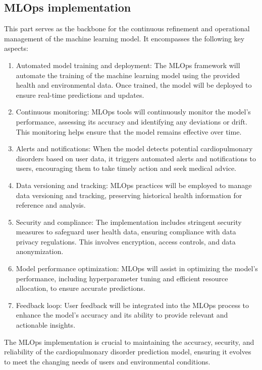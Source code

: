 \documentclass[12pt]{article}
\begin{document}
\subsection{MLOps implementation}
This part serves as the backbone for the continuous refinement and operational management of the machine learning model. It encompasses the following key aspects:
\begin{enumerate}
    \item Automated model training and deployment: The MLOps framework will automate the training of the machine learning model using the provided health and environmental data. Once trained, the model will be deployed to ensure real-time predictions and updates.

    \item Continuous monitoring: MLOps tools will continuously monitor the model's performance, assessing its accuracy and identifying any deviations or drift. This monitoring helps ensure that the model remains effective over time.

    \item Alerts and notifications: When the model detects potential cardiopulmonary disorders based on user data, it triggers automated alerts and notifications to users, encouraging them to take timely action and seek medical advice.

    \item Data versioning and tracking: MLOps practices will be employed to manage data versioning and tracking, preserving historical health information for reference and analysis.

    \item Security and compliance: The implementation includes stringent security measures to safeguard user health data, ensuring compliance with data privacy regulations. This involves encryption, access controls, and data anonymization.

    \item Model performance optimization: MLOps will assist in optimizing the model's performance, including hyperparameter tuning and efficient resource allocation, to ensure accurate predictions.

    \item Feedback loop: User feedback will be integrated into the MLOps process to enhance the model's accuracy and its ability to provide relevant and actionable insights.
\end{enumerate}
The MLOps implementation is crucial to maintaining the accuracy, security, and reliability of the cardiopulmonary disorder prediction model, ensuring it evolves to meet the changing needs of users and environmental conditions.
\end{document}
